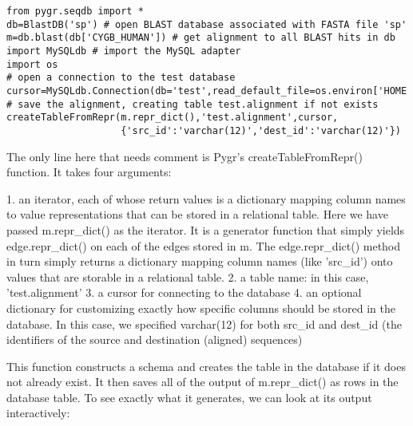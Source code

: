 \documentclass{howto}
\begin{document}
\begin{verbatim}
from pygr.seqdb import *
db=BlastDB('sp') # open BLAST database associated with FASTA file 'sp'
m=db.blast(db['CYGB_HUMAN']) # get alignment to all BLAST hits in db
import MySQLdb # import the MySQL adapter
import os
# open a connection to the test database
cursor=MySQLdb.Connection(db='test',read_default_file=os.environ['HOME']+'/.my.cnf').cursor()
# save the alignment, creating table test.alignment if not exists
createTableFromRepr(m.repr_dict(),'test.alignment',cursor,
                    {'src_id':'varchar(12)','dest_id':'varchar(12)'})
\end{verbatim}

The only line here that needs comment is Pygr's createTableFromRepr() function.  It takes four arguments:

   1. an iterator, each of whose return values is a dictionary mapping column names to value representations that can be stored in a relational table.  Here we have passed m.repr_dict() as the iterator.  It is a generator function that simply yields edge.repr_dict() on each of the edges stored in m.  The edge.repr_dict() method in turn simply returns a dictionary mapping column names (like 'src_id') onto values that are storable in a relational table.
   2. a table name: in this case, 'test.alignment'
   3. a cursor for connecting to the database
   4. an optional dictionary for customizing exactly how specific columns should be stored in the database.  In this case, we specified varchar(12) for both src_id and dest_id (the identifiers of the source and destination (aligned) sequences)

This function constructs a schema and creates the table in the database if it does not already exist.  It then saves all of the output of m.repr_dict() as rows in the database table.  To see exactly what it generates, we can look at its output interactively:
\end{document}
